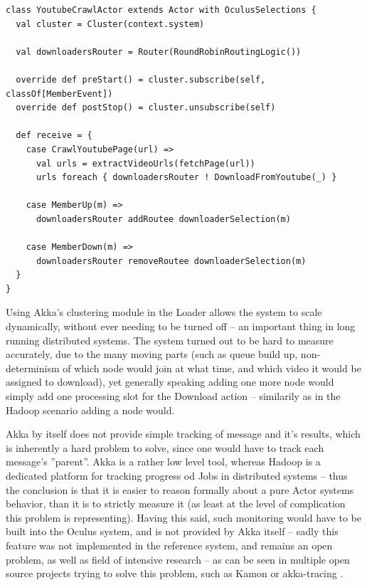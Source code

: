 \begin{lstlisting}[caption={Listening for Cluster events in Akka allows the application to dynamically respond to nodes being added to the cluster, and spreading the load in application logic to other nodes.}, label={lst:scaling-akka-cluster}]
class YoutubeCrawlActor extends Actor with OculusSelections {
  val cluster = Cluster(context.system)

  val downloadersRouter = Router(RoundRobinRoutingLogic())

  override def preStart() = cluster.subscribe(self, classOf[MemberEvent])
  override def postStop() = cluster.unsubscribe(self)

  def receive = {
    case CrawlYoutubePage(url) =>
      val urls = extractVideoUrls(fetchPage(url))
      urls foreach { downloadersRouter ! DownloadFromYoutube(_) }

    case MemberUp(m) => 
      downloadersRouter addRoutee downloaderSelection(m)
    
    case MemberDown(m) => 
      downloadersRouter removeRoutee downloaderSelection(m)
  }
}
\end{lstlisting}

Using Akka's clustering module in the Loader allows the system to scale dynamically, without ever needing to be turned off -- an important thing in long running distributed systems. The system turned out to be hard to measure accurately, due to the many moving parts (such as queue build up, non-determinism of which node would join at what time, and which video it would be assigned to download), yet generally speaking adding one more node would simply add one processing slot for the Download action -- similarily as in the Hadoop scenario adding a node would.

Akka by itself does not provide simple tracking of message and it's results, which is inherently a hard problem to solve, since one would have to track each message's ''parent''. Akka is a rather low level tool, whereas Hadoop is a dedicated platform for tracking progress od Jobs in distributed systems -- thus the conclusion is that it is easier to reason formally about a pure Actor systems behavior, than it is to strictly measure it (as least at the level of complication this problem is representing). Having this said, such monitoring would have to be built into the Oculus system, and is not provided by Akka itself -- sadly this feature was not implemented in the reference system, and remains an open problem, as well as field of intensive research -- as can be seen in multiple open source projects trying to solve this problem, such as Kamon \cite{kamon} or akka-tracing \cite{akka-tracing}.

